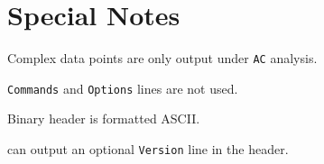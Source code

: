 \section{Special Notes}
\label{rawformatnotes}

\begin{XyceItemize}
\item Complex data points are only output under \texttt{AC} analysis.
\item \texttt{Commands} and \texttt{Options} lines are not used.
\item Binary header is formatted ASCII.
\item \Xyce{} can output an optional \texttt{Version} line in the header.
\end{XyceItemize}





